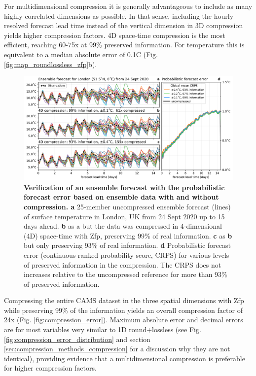 For multidimensional compression it is generally advantageous to include as many highly correlated dimensions as possible.
In that sense, including the hourly-resolved forecast lead time instead of the vertical dimension in 3D compression yields
higher compression factors. 4D space-time compression is the most efficient, reaching 60-75x at 99\% preserved information.
For temperature this is equivalent to a median absolute error of 0.1\textdegree{}C (Fig. \ref{fig:map_roundlossless_zfp}b).

\begin{figure}[tbhp]
	\includegraphics[width=1\textwidth]{Figures/compression/ensemble_forecast.pdf}
	\caption{\textbf{Verification of an ensemble forecast with the probabilistic forecast error based on ensemble data
	with and without compression. a} 25-member uncompressed ensemble forecast (lines) of surface temperature
	in London, UK from 24 Sept 2020 up to 15 days ahead. \textbf{b} as a but the data was compressed in 4-dimensional
	(4D) space-time with Zfp, preserving 99\% of real information. \textbf{c} as \textbf{b} but only preserving 93\% of real
	information. \textbf{d} Probabilistic forecast error (continuous ranked probability score, CRPS) for various levels of
	preserved information in the compression. The CRPS does not increases relative to the uncompressed reference for
	more than 93\% of preserved information.}
	\label{fig:ensemble_forecast}
\end{figure}

Compressing the entire CAMS dataset in the three spatial dimensions with Zfp while preserving 99\% of the information yields
an overall compression factor of 24x (Fig. \ref{fig:compression_error}). Maximum absolute error and decimal errors are for
most variables very similar to 1D round+lossless (see Fig. \ref{fig:compression_error_distribution} and section
\ref{sec:compression_methods_compression} for a discussion why they are not identical), providing evidence that a
multidimensional compression is preferable for higher compression factors. 

